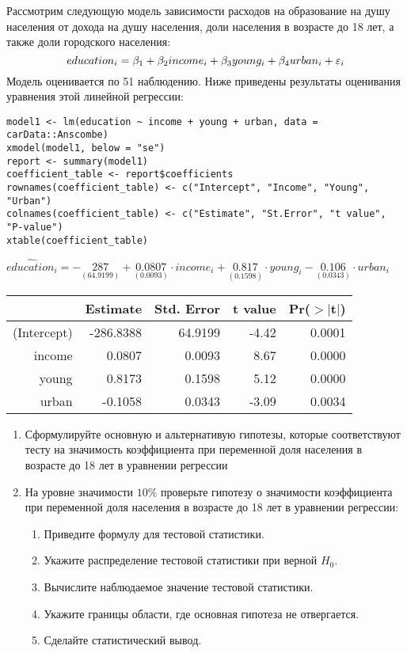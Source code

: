 \begin{problem} %
Рассмотрим следующую модель зависимости расходов на образование на душу населения от дохода на душу населения, доли населения в возрасте до 18 лет, а также доли городского населения:
\[
education_i = \beta_1 + \beta_2 income_i + \beta_3 young_i + \beta_4 urban_i + \varepsilon_i
\]
Модель оценивается по 51 наблюдению.
Ниже приведены результаты оценивания уравнения этой линейной регрессии:

\begin{verbatim}
model1 <- lm(education ~ income + young + urban, data = carData::Anscombe)
xmodel(model1, below = "se")
report <- summary(model1)
coefficient_table <- report$coefficients
rownames(coefficient_table) <- c("Intercept", "Income", "Young", "Urban")
colnames(coefficient_table) <- c("Estimate", "St.Error", "t value", "P-value")
xtable(coefficient_table)
\end{verbatim}


\begin{center}
\ensuremath{\widehat{education}_i=-\underset{( 64.9199 )}{ 287 }+\underset{( 0.0093)}{0.0807}\cdot income_i+\underset{( 0.1598)}{0.817}\cdot young_i-\underset{( 0.0343)}{0.106}\cdot urban_i}

\begin{tabular}{rrrrr}
  \hline
 & Estimate & Std. Error & t value & Pr($>$$|$t$|$) \\
  \hline
(Intercept) & -286.8388 & 64.9199 & -4.42 & 0.0001 \\
  income & 0.0807 & 0.0093 & 8.67 & 0.0000 \\
  young & 0.8173 & 0.1598 & 5.12 & 0.0000 \\
  urban & -0.1058 & 0.0343 & -3.09 & 0.0034 \\
   \hline
\end{tabular}
\end{center}

\begin{enumerate}
\item Сформулируйте основную и альтернативую гипотезы, которые соответствуют тесту на значимость коэффициента при переменной доля населения в возрасте до 18 лет в уравнении регрессии
\item На уровне значимости $10\%$ проверьте гипотезу о значимости коэффициента при переменной доля населения в возрасте до 18 лет в уравнении регрессии:
\begin{enumerate}
\item Приведите формулу для тестовой статистики.
\item Укажите распределение тестовой статистики при верной $H_0$.
\item Вычислите наблюдаемое значение тестовой статистики.
\item Укажите границы области, где основная гипотеза не отвергается.
\item Сделайте статистический вывод.
\end{enumerate}



\end{enumerate}
\end{problem}
